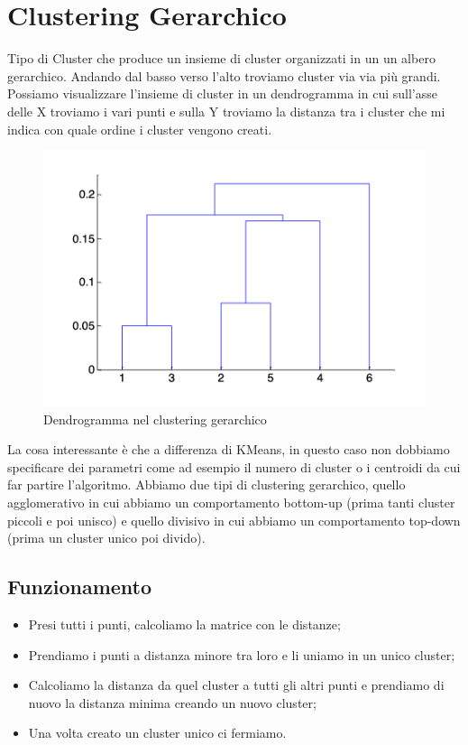 \documentclass[14pt]{extreport}
\begin{document}
\chapter{Clustering Gerarchico}

Tipo di Cluster che produce un insieme di cluster organizzati in un un albero gerarchico. Andando dal basso verso l'alto troviamo cluster via via più grandi.
Possiamo visualizzare l'insieme di cluster in un dendrogramma in cui sull'asse delle X troviamo i vari punti e sulla Y troviamo la distanza tra i cluster che mi indica con quale ordine i cluster vengono creati.

\begin{figure}[h!]
  \includegraphics[width=\linewidth]{Dendrogramma.png}
  \caption{Dendrogramma nel clustering gerarchico}
\end{figure}

La cosa interessante è che a differenza di KMeans, in questo caso non dobbiamo specificare dei parametri come ad esempio il numero di cluster o i centroidi da cui far partire l'algoritmo.
Abbiamo due tipi di clustering gerarchico, quello agglomerativo in cui abbiamo un comportamento bottom-up (prima tanti cluster piccoli e poi unisco) e quello divisivo in cui abbiamo un comportamento top-down (prima un cluster unico poi divido).



\section{Funzionamento}

\begin{itemize}
    \item Presi tutti i punti, calcoliamo la matrice con le distanze;
    \item Prendiamo i punti a distanza minore tra loro e li uniamo in un unico cluster;
    \item Calcoliamo la distanza da quel cluster a tutti gli altri punti e prendiamo di nuovo la distanza minima creando un nuovo cluster;
    \item Una volta creato un cluster unico ci fermiamo.
\end{itemize}
\end{document}
